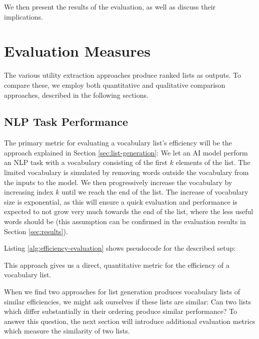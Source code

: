 We then present the results of the evaluation, as well as discuss their implications. 

\section{Evaluation Measures}

The various utility extraction approaches produce ranked lists as outputs.
To compare these, we employ both quantitative and qualitative comparison approaches, described in the following sections.

\subsection{NLP Task Performance}
The primary metric for evaluating a vocabulary list's efficiency will be the approach explained in Section \ref{sec:list-generation}:
We let an AI model perform an NLP task with a vocabulary consisting of the first $k$ elements of the list.
The limited vocabulary is simulated by removing words outside the vocabulary from the inputs to the model.
We then progressively increase the vocabulary by increasing index $k$ until we reach the end of the list.
The increase of vocabulary size is exponential, as this will ensure a quick evaluation and performance is expected to not grow very much towards the end of the list, where the less useful words should be (this assumption can be confirmed in the evaluation results in Section \ref{sec:results}).

Listing \ref{alg:efficiency-evaluation} shows pseudocode for the described setup:




This approach gives us a direct, quantitative metric for the efficiency of a vocabulary list.

When we find two approaches for list generation produces vocabulary lists of similar efficiencies, we might ask ourselves if these lists are similar:
Can two lists which differ substantially in their ordering produce similar performance?
To answer this question, the next section will introduce additional evaluation metrics which measure the similarity of two lists.

